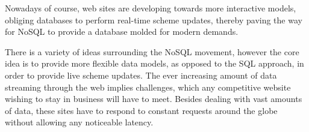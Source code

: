 Nowadays of course,  web sites are developing towards more interactive models, obliging databases to perform real-time scheme updates, thereby paving the way for NoSQL to provide a database molded for modern demands. %


There is a variety of ideas surrounding the NoSQL movement, however the core idea is to provide more flexible data models, as opposed to the SQL approach, in order to provide live scheme updates. The ever increasing amount of data streaming through the web implies challenges, which any competitive website wishing to stay in business will have to meet. Besides dealing with vast amounts of data, these sites have to respond to constant requests around the globe without allowing any noticeable latency.

